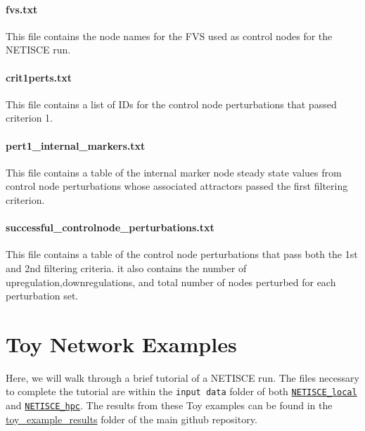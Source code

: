 \documentclass[
]{book}
\begin{document}
\hypertarget{section-id}{%
\subsubsection*{fvs.txt}\label{section-id}}

This file contains the node names for the FVS used as control nodes for the NETISCE run.

\hypertarget{section-id}{%
\subsubsection*{crit1perts.txt}\label{section-id}}

This file contains a list of IDs for the control node perturbations that passed criterion 1.

\hypertarget{section-id}{%
\subsubsection*{pert1\_internal\_markers.txt}\label{section-id}}

This file contains a table of the internal marker node steady state values from control node perturbations whose associated attractors passed the first filtering criterion.

\hypertarget{section-id}{%
\subsubsection*{successful\_controlnode\_perturbations.txt}\label{section-id}}

This file contains a table of the control node perturbations that pass both the 1st and 2nd filtering criteria. it also contains the number of upregulation,downregulations, and total number of nodes perturbed for each perturbation set.

\hypertarget{toy}{%
\chapter{Toy Network Examples}\label{toy}}

Here, we will walk through a brief tutorial of a NETISCE run. The files necessary to complete the tutorial are within the \texttt{input\ data} folder of both \href{https://github.com/VeraLiconaResearchGroup/Netisce/tree/main/NETICSE_local}{\texttt{NETISCE\_local}} and \href{https://github.com/VeraLiconaResearchGroup/Netisce/tree/main/NETICSE_hpc}{\texttt{NETISCE\_hpc}}.
The results from these Toy examples can be found in the \href{https://github.com/VeraLiconaResearchGroup/Netisce/tree/main/toy_example_results}{toy\_example\_results} folder of the main github repository.
\end{document}
